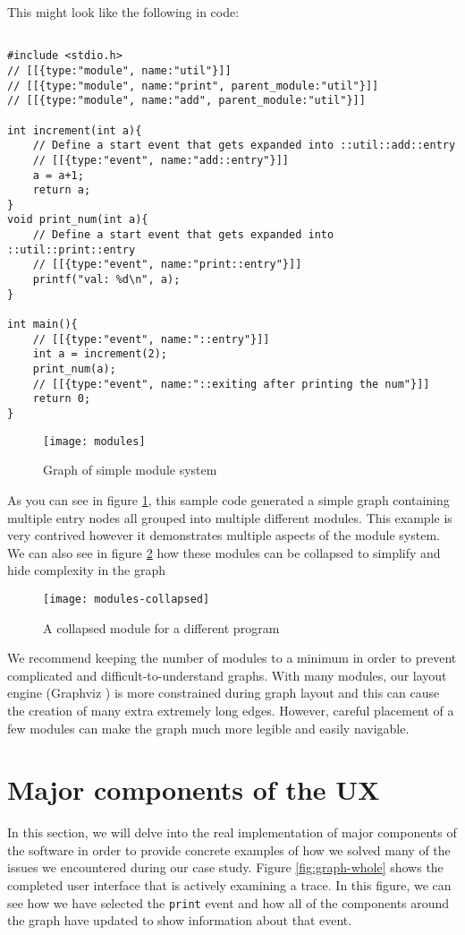 This might look like the following in code:

\begin{verbatim}

#include <stdio.h>
// [[{type:"module", name:"util"}]]
// [[{type:"module", name:"print", parent_module:"util"}]]
// [[{type:"module", name:"add", parent_module:"util"}]]

int increment(int a){
    // Define a start event that gets expanded into ::util::add::entry
    // [[{type:"event", name:"add::entry"}]]
    a = a+1;
    return a;
}
void print_num(int a){
    // Define a start event that gets expanded into ::util::print::entry
    // [[{type:"event", name:"print::entry"}]]
    printf("val: %d\n", a);
}

int main(){
    // [[{type:"event", name:"::entry"}]]
    int a = increment(2);
    print_num(a);
    // [[{type:"event", name:"::exiting after printing the num"}]]
    return 0;
}
\end{verbatim}
\begin{figure}[!ht]
    \centering
\texttt{[image: modules]}
    \caption{Graph of simple module system}
    \label{fig:modules}
\end{figure}

As you can see in figure \ref{fig:modules}, this sample code generated a simple graph containing multiple entry nodes all grouped into multiple different modules. This example is very contrived however it demonstrates multiple aspects of the module system. We can also see in figure \ref{fig:modules-collapsed} how these modules can be collapsed to simplify and hide complexity in the graph


\begin{figure}[!ht]
\centering
\texttt{[image: modules-collapsed]}
\caption{A collapsed module for a different program}
    \label{fig:modules-collapsed}
\end{figure}

We recommend keeping the number of modules to a minimum in order to prevent complicated and difficult-to-understand graphs. With many modules, our layout engine (Graphviz \cite{graphviz}) is more constrained during graph layout and this can cause the creation of many extra extremely long edges. However, careful placement of a few modules can make the graph much more legible and easily navigable. 

\section{Major components of the UX}
In this section, we will delve into the real implementation of major components of the software in order to provide concrete examples of how we solved many of the issues we encountered during our case study. Figure \ref{fig:graph-whole} shows the completed user interface that is actively examining a trace. In this figure, we can see how we have selected the \texttt{print} event and how all of the components around the graph have updated to show information about that event. 

